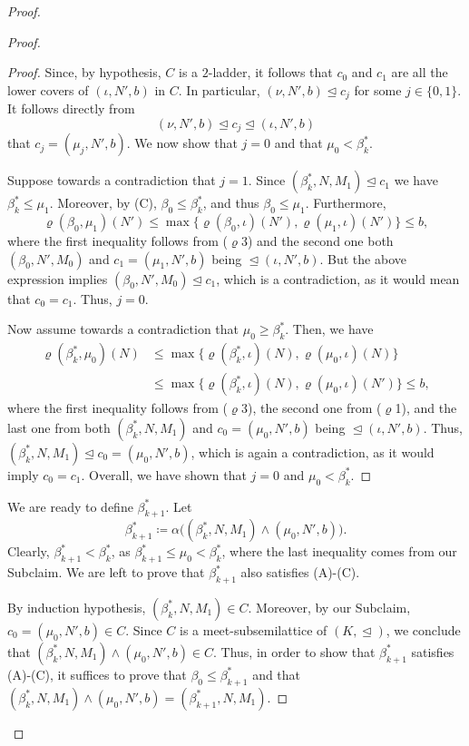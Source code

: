 \documentclass[]{amsart}
\theoremstyle{definition}
\theoremstyle{remark}
\begin{document}
\begin{proof}
\begin{proof}
\begin{proof}
Since, by hypothesis, $C$ is a $2$-ladder, it follows that $c_0$ and $c_1$ are all the lower covers of $(\iota, N', b)$ in $C$. In particular, $(\nu, N', b) \trianglelefteq c_j$ for some $j \in \{0,1\}$. It follows directly from
\[
(\nu, N', b) \trianglelefteq c_j \trianglelefteq (\iota, N', b)
\]
that $c_j = (\mu_j, N', b)$. We now show that $j = 0$ and that $\mu_0 < \beta^*_k$.


Suppose towards a contradiction that $j = 1$. Since $(\beta^*_k, N, M_1) \trianglelefteq c_1$ we have $\beta^*_k \le \mu_1$. Moreover, by (C), $\beta_0 \le \beta^*_k$, and thus $\beta_0 \le \mu_1$. Furthermore,
\[
\varrho(\beta_0, \mu_1)(N') \le \max\{\varrho(\beta_0, \iota)(N'), \varrho(\mu_1, \iota)(N')\} \le b,
\]
where the first inequality follows from ($\varrho$3) and the second one both $(\beta_0, N', M_0)$ and $c_1  = (\mu_1, N', b)$ being $\trianglelefteq (\iota, N', b)$. But the above expression implies $(\beta_0, N', M_0) \trianglelefteq c_1$, which is a contradiction, as it would mean that $c_0 = c_1$. Thus, $j = 0$. 

Now assume towards a contradiction that $\mu_0 \ge \beta^*_k$. Then, we have
\begin{align*}
\varrho(\beta^*_k, \mu_0)(N) &\le \max\{\varrho(\beta^*_k, \iota)(N), \varrho(\mu_0, \iota)(N)\}\\&\le\max\{\varrho(\beta^*_k, \iota)(N), \varrho(\mu_0, \iota)(N')\} \le b,
\end{align*}
where the first inequality follows from ($\varrho$3), the second one from ($\varrho$1), and the last one from both $(\beta^*_k, N, M_1)$ and $c_0 = (\mu_0, N', b)$ being  $\trianglelefteq (\iota, N', b)$. Thus, $(\beta^*_k, N, M_1) \trianglelefteq c_0 = (\mu_0, N', b)$, which is again a contradiction, as it would imply $c_0 = c_1$. Overall, we have shown that $j = 0$ and $\mu_0 < \beta^*_k$. 
\end{proof}


We are ready to define $\beta^*_{k+1}$. Let
\[
\beta^*_{k+1} \coloneqq \alpha\big((\beta^*_k, N, M_1) \wedge (\mu_0, N', b)\big).
\]
Clearly, $\beta^*_{k+1} < \beta^*_k$, as $\beta^*_{k+1} \le \mu_0 < \beta^*_k$, where the last inequality comes from our Subclaim. We are left to prove that $\beta^*_{k+1}$ also satisfies (A)-(C).

By induction hypothesis, $(\beta^*_k, N, M_1) \in C$. Moreover, by our Subclaim, $c_0 = (\mu_0, N', b) \in C$. Since $C$ is a meet-subsemilattice of $(K, \trianglelefteq)$, we conclude that $(\beta^*_k, N, M_1) \wedge (\mu_0, N', b) \in C$. Thus, in order to show that $\beta^*_{k+1}$ satisfies (A)-(C), it suffices to prove that $\beta_0 \le \beta^*_{k+1}$ and that $(\beta^*_k, N, M_1) \wedge (\mu_0, N', b) = (\beta^*_{k+1}, N, M_1)$. 


\end{proof}
\end{proof}
\end{document}
